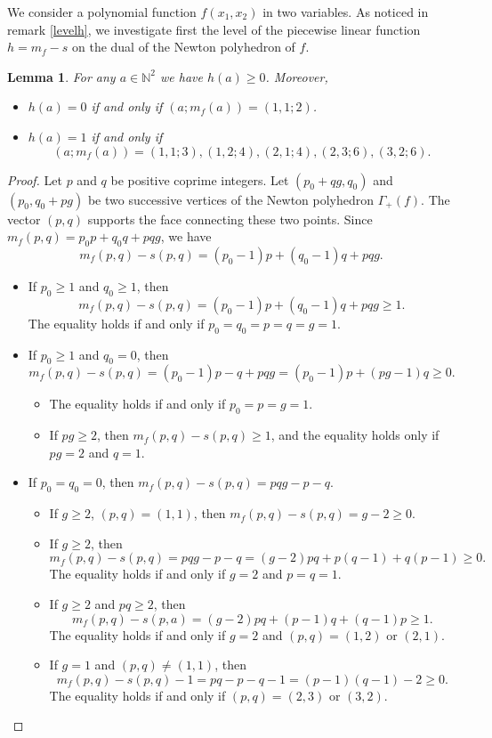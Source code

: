 \documentclass[12pt,a4paper,leqno]{amsart}
\newtheorem{lem}[thm]{Lemma}
\theoremstyle{definition}
\begin{document}
We consider a polynomial function $f(x_1,x_2)$ in two variables. As
noticed in remark \ref{levelh}, we investigate first the level of the
piecewise linear function $h=m_f-s$ on the dual of the Newton
polyhedron of $f$.

\begin{lem}
For any $a\in {\mathbb{N}}^2$ we have $h(a)\ge0$. Moreover, 
\begin{itemize}
\item $h(a)=0$ if and only if $(a;m_f(a))=(1,1;2)$. 
\item $h(a)=1$ if and only if 
$$
(a;m_f(a))=(1,1;3), (1,2;4), (2,1;4), (2,3;6), (3,2;6).
$$ 
\end{itemize}
\end{lem}
\begin{proof}
Let $p$ and $q$ be positive coprime integers.
Let $(p_0+qg,q_0)$ and $(p_0,q_0+pg)$ be two successive vertices of the Newton polyhedron $\Gamma_+(f)$.
The vector $(p,q)$ supports the face connecting these two points. 
Since $m_f(p,q)=p_0p+q_0q+pqg$, we have 
$$
m_f(p,q)-s(p,q)=(p_0-1)p+(q_0-1)q+pqg.
$$
\begin{itemize}
\item 
If $p_0\ge1$ and $q_0\ge1$, then  
$$
m_f(p,q)-s(p,q)=(p_0-1)p+(q_0-1)q+pqg\ge1.
$$  
The equality holds if and only if $p_0=q_0=p=q=g=1$.
\item 
If $p_0\ge1$ and $q_0=0$, then 
$$
m_f(p,q)-s(p,q)=(p_0-1)p-q+pqg=(p_0-1)p+(pg-1)q\ge0.
$$
\begin{itemize}
\item The equality holds if and only if $p_0=p=g=1$. 
\item If $pg\ge2$, then $m_f(p,q)-s(p,q)\ge1$, 
and the equality holds only if $pg=2$ and $q=1$. 
\end{itemize}
\item 
If $p_0=q_0=0$, then $m_f(p,q)-s(p,q)=pqg-p-q$. 
\begin{itemize}
\item 
If $g\ge2$, $(p,q)=(1,1)$, then  
$m_f(p,q)-s(p,q)=g-2\ge0$.
\item 
If $g\ge2$, then  
$$
m_f(p,q)-s(p,q)=pqg-p-q=(g-2)pq+p(q-1)+q(p-1)\ge0.
$$ 
The equality holds if and only if $g=2$ and $p=q=1$. 
\item 
If $g\ge2$ and $pq\ge2$, then 
$$
m_f(p,q)-s(p,a)=(g-2)pq+(p-1)q+(q-1)p\ge1.
$$  
The equality holds if and only if $g=2$ and $(p,q)=(1,2)$ or $(2,1)$. 
\item If $g=1$ and $(p,q)\ne(1,1)$, then 
$$
m_f(p,q)-s(p,q)-1=pq-p-q-1=(p-1)(q-1)-2\ge0. 
$$
The equality holds if and only if $(p,q)=(2,3)$ or $(3,2)$. 
\end{itemize}
\end{itemize}
\end{proof}
\end{document}
